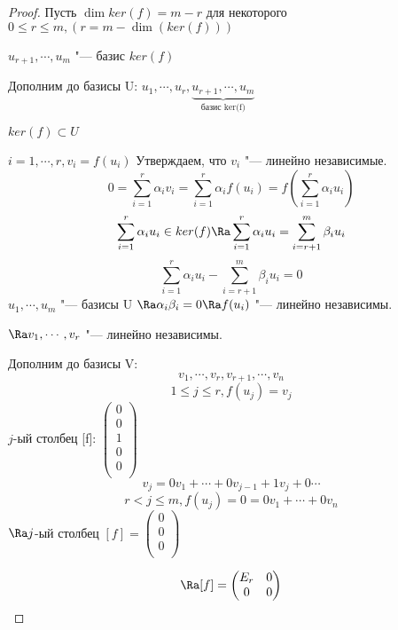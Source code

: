 \begin{proof}
Пусть $\dim ker(f) = m - r$ для некоторого $0 \le r \le m, (r = m - \dim(ker(f)))$

$u_{r + 1}, \cdots, u_{m}$ "--- базис $ker(f)$

Дополним до базисы U: $u_1, \cdots, u_r, \underbrace{u_{r + 1}, \cdots, u_{m}}_{\text{базис ker(f)}}$

$ker(f) \subset U$

$i = 1, \cdots, r, v_{i} = f(u_i)$
Утверждаем, что $v_i$ "--- линейно независимые.
$$0 = \sum_{i = 1}^{r}\alpha_{i}v_{i} = \sum_{i = 1}^{r} \alpha_{i}f(u_{i})= f(\sum_{i = 1}^{r}\alpha_{i}u_{i})$$
$$\sum_{i = 1}^{r}\alpha_{i}u_{i} \in ker(f) \Ra \sum_{i = 1}^{r}\alpha_{i}u_{i} = \sum_{i = r + 1}^{m}\beta_i u_i$$
$$\sum_{i = 1}^{r}\alpha_{i}u_{i} - \sum_{i = r + 1}^{m}\beta_{i}u_{i} = 0$$
$u_1, \cdots, u_m$ "--- базисы U $\Ra \alpha_i \beta_{i} = 0 \Ra f(u_i)$ "--- линейно независимы.

$\Ra v_1, \cdots, v_{r}$ "--- линейно независимы.

Дополним до базисы V:
$$v_{1}, \cdots, v_{r}, v_{r + 1}, \cdots, v_{n}$$
$$1 \le j \le r, f(u_{j}) = v_{j}$$
$j$-ый столбец [f]: $\begin{pmatrix} 0\\0\\1\\0\\0\\ \end{pmatrix}$                            
$$v_{j} = 0v_{1} + \cdots + 0v_{j - 1} + 1v_{j} + 0 \cdots$$
$$r < j \le m, f(u_{j}) = 0 = 0 v_1 + \cdots + 0v_n $$
$\Ra j$-ый столбец $[f] = \begin{pmatrix} 0\\ 0\\ 0\\ \end{pmatrix}$

$$\Ra [f] = 
\begin{pmatrix}
E_r&0\\
0&0\\
\end{pmatrix}$$
\end{proof}

